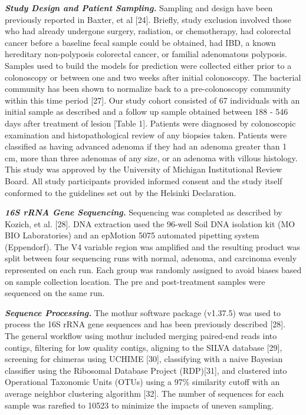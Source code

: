 \documentclass[12pt,]{article}
\begin{document}
\textbf{\emph{Study Design and Patient Sampling.}} Sampling and design
have been previously reported in Baxter, et al {[}24{]}. Briefly, study
exclusion involved those who had already undergone surgery, radiation,
or chemotherapy, had colorectal cancer before a baseline fecal sample
could be obtained, had IBD, a known hereditary non-polyposis colorectal
cancer, or familial adenomatous polyposis. Samples used to build the
models for prediction were collected either prior to a colonoscopy or
between one and two weeks after initial colonoscopy. The bacterial
community has been shown to normalize back to a pre-colonoscopy
community within this time period {[}27{]}. Our study cohort consisted
of 67 individuals with an initial sample as described and a follow up
sample obtained between 188 - 546 days after treatment of lesion
{[}Table 1{]}. Patients were diagnosed by colonoscopic examination and
histopathological review of any biopsies taken. Patients were classified
as having advanced adenoma if they had an adenoma greater than 1 cm,
more than three adenomas of any size, or an adenoma with villous
histology. This study was approved by the University of Michigan
Institutional Review Board. All study participants provided informed
consent and the study itself conformed to the guidelines set out by the
Helsinki Declaration.

\textbf{\emph{16S rRNA Gene Sequencing.}} Sequencing was completed as
described by Kozich, et al. {[}28{]}. DNA extraction used the 96-well
Soil DNA isolation kit (MO BIO Laboratories) and an epMotion 5075
automated pipetting system (Eppendorf). The V4 variable region was
amplified and the resulting product was split between four sequencing
runs with normal, adenoma, and carcinoma evenly represented on each run.
Each group was randomly assigned to avoid biases based on sample
collection location. The pre and post-treatment samples were sequenced
on the same run.

\textbf{\emph{Sequence Processing.}} The mothur software package
(v1.37.5) was used to process the 16S rRNA gene sequences and has been
previously described {[}28{]}. The general workflow using mothur
included merging paired-end reads into contigs, filtering for low
quality contigs, aligning to the SILVA database {[}29{]}, screening for
chimeras using UCHIME {[}30{]}, classifying with a naive Bayesian
classifier using the Ribosomal Database Project (RDP){[}31{]}, and
clustered into Operational Taxonomic Units (OTUs) using a 97\%
similarity cutoff with an average neighbor clustering algorithm
{[}32{]}. The number of sequences for each sample was rarefied to 10523
to minimize the impacts of uneven sampling.
\end{document}

